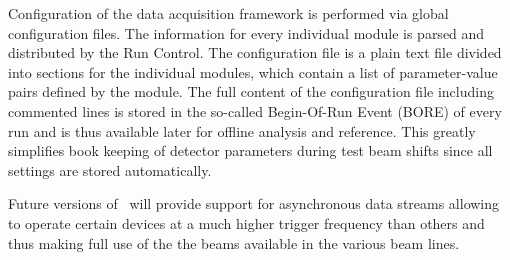 Configuration of the data acquisition framework is performed via global configuration files. 
The information for every individual module is parsed and distributed by the Run Control. 
The configuration file is a plain text file divided into sections for the individual modules, which contain a list of parameter-value pairs defined by the module.
The full content of the configuration file including commented lines is stored in the so-called Begin-Of-Run Event (BORE) of every run and is thus available later for offline analysis and reference. This greatly simplifies book keeping of detector parameters during test beam shifts since all settings are stored automatically.


Future versions of \eudaq\ will provide support for asynchronous data streams allowing to operate certain devices at a much higher trigger frequency than others and thus making full use of the the beams available in the various beam lines.
